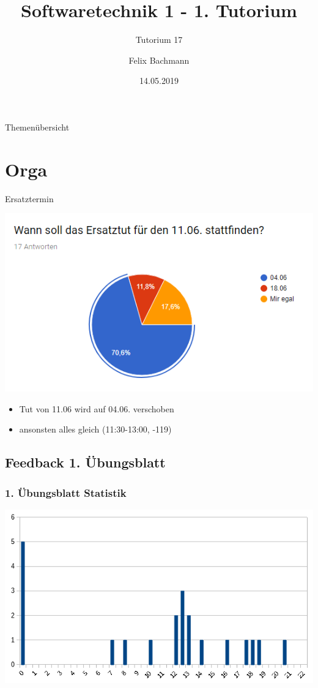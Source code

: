 \documentclass[18pt]{beamer}
\title[SWT1]{Softwaretechnik 1 - 1. Tutorium}
\subtitle{Tutorium 17}
\author{Felix Bachmann}
\date{14.05.2019}
\institute{KIT - Institut für Programmstrukturen und Datenorganisation (IPD)}
\begin{document}

\begin{frame}
\titlepage
\end{frame}

\begin{frame}{Themenübersicht}
\tableofcontents
\end{frame}

\section{Orga}

	\begin{frame}{Ersatztermin}

	\centering
	\includegraphics[scale=0.7]{pics/tut1/poll.png}
		\begin{itemize}
		\item Tut von 11.06 wird auf 04.06. verschoben
		\item ansonsten alles gleich (11:30-13:00, -119) 
	\end{itemize}
\end{frame}


	\subsection{Feedback 1. Übungsblatt}
	\begin{frame}
		\frametitle{1. Übungsblatt Statistik}
		\includegraphics[scale=0.7]{./pics/tut1/statistics_ub1.png}
	\end{frame}
	
\end{document}
